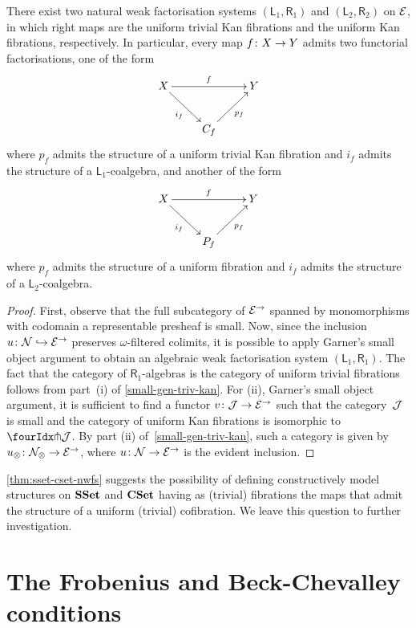 \documentclass[reqno,10pt,a4paper,oneside]{amsart}
\begin{document}
\begin{theorem} \label{thm:sset-cset-nwfs}
There exist two natural weak factorisation systems $(\mathsf{L}_1, \mathsf{R}_1)$ and $(\mathsf{L}_2, \mathsf{R}_2)$ on $\catE$, in which right maps are the uniform trivial Kan fibrations and the uniform Kan fibrations, respectively.
In particular, every map $f \co X \to Y$ admits two functorial factorisations, one of the form
\[
\xymatrix{
  X \ar[rr]^f \ar[dr]_{i_f} & & Y \\
  & C_f \ar[ur]_{p_f}
}
\]
where $p_f$ admits the structure of a uniform trivial Kan fibration and $i_f$ admits the structure of a $\mathsf{L}_1$-coalgebra, and another of the form
\[
\xymatrix{
X \ar[rr]^f \ar[dr]_{i_f} & & Y \\
 & P_f \ar[ur]_{p_f} }
 \]
where $p_f$ admits the structure of a uniform fibration and $i_f$ admits the structure of a $\mathsf{L}_2$-coalgebra.
\end{theorem}


\begin{proof} First, observe that the full subcategory of $\cal{E}^\to$ spanned by monomorphisms with codomain a representable presheaf is small.
Now, since the inclusion~$u \co \cal{N} \hookrightarrow \catE^\to$ preserves $\omega$-filtered colimits, it is possible to apply Garner's small object argument to obtain an algebraic weak factorisation system $(\mathsf{L}_1, \mathsf{R}_1)$.
The fact that the category of $\mathsf{R}_1$-algebras is the category of uniform trivial fibrations follows from part~(i) of \cref{small-gen-triv-kan}.
For (ii), Garner's small object argument, it is sufficient to find a functor $v \co \cal{J} \rightarrow \catE^\to$ such that the category~$\cal{J}$ is small and the category of uniform Kan fibrations is isomorphic to~$\liftr{\cal{J}}$.
By part (ii) of~\cref{small-gen-triv-kan}, such a category is given by $u_\otimes \co \cal{N}_\otimes \rightarrow \catE^\to$, where $u \co \cal{N} \to \cal{E}^\to$ is the evident inclusion.
\end{proof}

\cref{thm:sset-cset-nwfs} suggests the possibility of defining constructively model structures on $\SSet$ and $\CSet$ having as (trivial) fibrations the maps that admit the structure of a uniform (trivial) cofibration.
We leave this question to further investigation.







\section{The Frobenius and Beck-Chevalley conditions}
\label{sec:frobc}
\end{document}
